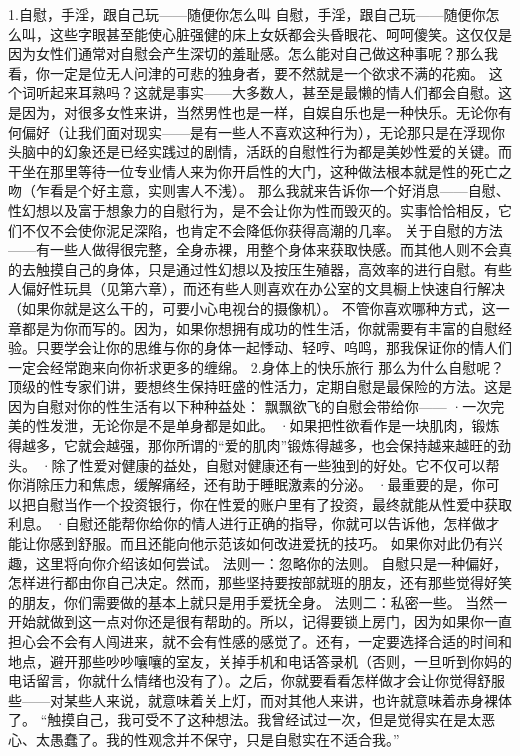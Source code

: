 \documentclass[12pt,UTF8,openany]{ctexbook}
\begin{document}
1.自慰，手淫，跟自己玩——随便你怎么叫
自慰，手淫，跟自己玩——随便你怎么叫，这些字眼甚至能使心脏强健的床上女妖都会头昏眼花、呵呵傻笑。这仅仅是因为女性们通常对自慰会产生深切的羞耻感。怎么能对自己做这种事呢？那么我看，你一定是位无人问津的可悲的独身者，要不然就是一个欲求不满的花痴。
这个词听起来耳熟吗？这就是事实——大多数人，甚至是最懒的情人们都会自慰。这是因为，对很多女性来讲，当然男性也是一样，自娱自乐也是一种快乐。无论你有何偏好（让我们面对现实——是有一些人不喜欢这种行为），无论那只是在浮现你头脑中的幻象还是已经实践过的剧情，活跃的自慰性行为都是美妙性爱的关键。而干坐在那里等待一位专业情人来为你开启性的大门，这种做法根本就是性的死亡之吻（乍看是个好主意，实则害人不浅）。
那么我就来告诉你一个好消息——自慰、性幻想以及富于想象力的自慰行为，是不会让你为性而毁灭的。实事恰恰相反，它们不仅不会使你泥足深陷，也肯定不会降低你获得高潮的几率。
关于自慰的方法——有一些人做得很完整，全身赤裸，用整个身体来获取快感。而其他人则不会真的去触摸自己的身体，只是通过性幻想以及按压生殖器，高效率的进行自慰。有些人偏好性玩具（见第六章），而还有些人则喜欢在办公室的文具橱上快速自行解决（如果你就是这么干的，可要小心电视台的摄像机）。
不管你喜欢哪种方式，这一章都是为你而写的。因为，如果你想拥有成功的性生活，你就需要有丰富的自慰经验。只要学会让你的思维与你的身体一起悸动、轻哼、呜鸣，那我保证你的情人们一定会经常跑来向你祈求更多的缠绵。
2.身体上的快乐旅行
那么为什么自慰呢？顶级的性专家们讲，要想终生保持旺盛的性活力，定期自慰是最保险的方法。这是因为自慰对你的性生活有以下种种益处：
飘飘欲飞的自慰会带给你——
·一次完美的性发泄，无论你是不是单身都是如此。
·如果把性欲看作是一块肌肉，锻炼得越多，它就会越强，那你所谓的“爱的肌肉”锻炼得越多，也会保持越来越旺的劲头。
·除了性爱对健康的益处，自慰对健康还有一些独到的好处。它不仅可以帮你消除压力和焦虑，缓解痛经，还有助于睡眠激素的分泌。
·最重要的是，你可以把自慰当作一个投资银行，你在性爱的账户里有了投资，最终就能从性爱中获取利息。
·自慰还能帮你给你的情人进行正确的指导，你就可以告诉他，怎样做才能让你感到舒服。而且还能向他示范该如何改进爱抚的技巧。
如果你对此仍有兴趣，这里将向你介绍该如何尝试。
法则一：忽略你的法则。
自慰只是一种偏好，怎样进行都由你自己决定。然而，那些坚持要按部就班的朋友，还有那些觉得好笑的朋友，你们需要做的基本上就只是用手爱抚全身。
法则二：私密一些。
当然一开始就做到这一点对你还是很有帮助的。所以，记得要锁上房门，因为如果你一直担心会不会有人闯进来，就不会有性感的感觉了。还有，一定要选择合适的时间和地点，避开那些吵吵嚷嚷的室友，关掉手机和电话答录机（否则，一旦听到你妈的电话留言，你就什么情绪也没有了）。之后，你就要看看怎样做才会让你觉得舒服些——对某些人来说，就意味着关上灯，而对其他人来讲，也许就意味着赤身裸体了。
“触摸自己，我可受不了这种想法。我曾经试过一次，但是觉得实在是太恶心、太愚蠢了。我的性观念并不保守，只是自慰实在不适合我。”
\end{document}

